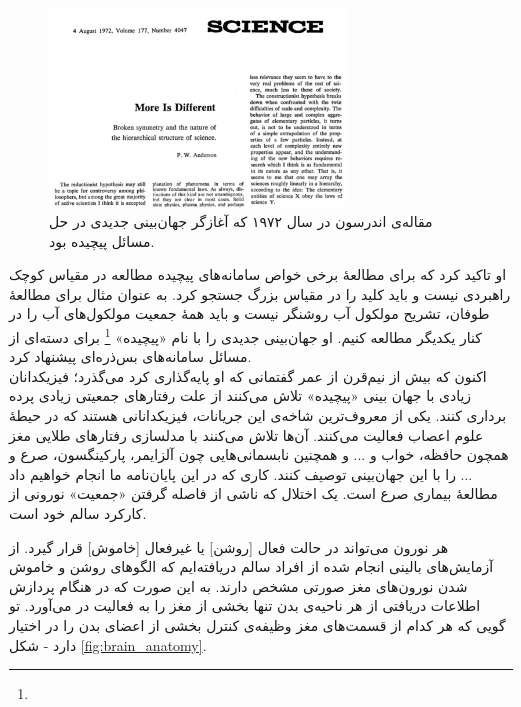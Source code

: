 \begin{figure}
	\centering
	\includegraphics[width=0.7\textwidth]{../Figures/more_is_different_anderson.png}
	\caption{مقاله‌ی اندرسون در سال ۱۹۷۲ که آغازگر جهان‌بینی جدیدی در حل مسائل پیچیده بود.}
	\label{fig:anderson}
\end{figure}


او تاکید کرد که برای مطالعهٔ برخی خواص سامانه‌های پیچیده مطالعه در مقیاس کوچک راهبردی نیست و باید کلید را در مقیاس بزرگ جستجو کرد. به عنوان مثال برای مطالعهٔ طوفان، تشریح مولکول آب روشنگر نیست و باید همهٔ جمعیت مولکول‌های آب را در کنار یکدیگر مطالعه کنیم. او  جهان‌بینی جدیدی را با نام «پیچیده»
\footnote{
}
 برای دسته‌ای از مسائل سامانه‌های بس‌ذره‌ای پیشنهاد کرد.\\
 
 اکنون که بیش از نیم‌قرن از عمر گفتمانی که او پایه‌گذاری کرد می‌گذرد؛ فیزیکدانان زیادی با جهان بینی «پیچیده» تلاش می‌کنند از علت رفتارهای جمعیتی زیادی پرده برداری کنند. یکی از معروف‌ترین شاخه‌ی این جریانات، فیزیکدانانی هستند که در حیطهٔ علوم اعصاب فعالیت می‌کنند. آن‌ها تلاش می‌کنند با مدلسازی رفتارهای طلایی مغز همچون حافظه، خواب و ... و همچنین نابسمانی‌هایی چون آلزایمر، پارکینگسون، صرع و ... را با این جهان‌بینی توصیف کنند. کاری که در این پایان‌نامه ما انجام خواهیم داد مطالعهٔ بیماری صرع است. یک اختلال که ناشی از فاصله گرفتن «جمعیت» نورونی از کارکرد سالم خود است.

 هر نورون‌ می‌تواند در حالت فعال [روشن] یا غیرفعال [خاموش] قرار گیرد. از آزمایش‌های بالینی انجام شده از افراد سالم دریافته‌ایم که الگوهای روشن و خاموش شدن نورون‌های مغز صورتی مشخص دارند. به این صورت که در هنگام پردازش اطلاعات دریافتی از هر ناحیه‌ی بدن تنها بخشی از مغز را به فعالیت در می‌آورد. تو گویی که هر کدام از قسمت‌های مغز وظیفه‌ی کنترل بخشی از اعضای بدن را در اختیار دارد - شکل \ref{fig:brain_anatomy}. 

